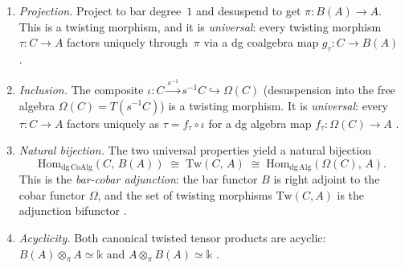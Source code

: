\begin{proposition}\label{prop:universal-twisting-adjunction}
\begin{enumerate}[label=\textup{(\roman*)}]
\item \emph{Projection.}
  Project to bar degree~$1$ and desuspend to get
  $\pi\colon B(A) \to A$.
  This is a twisting morphism, and it is \emph{universal}:
  every twisting morphism $\tau\colon C \to A$ factors
  uniquely through~$\pi$ via a dg coalgebra map
  $g_\tau\colon C \to B(A)$
  \cite[Theorem~2.2.4]{LV12}.

\item \emph{Inclusion.}
  The composite
  $\iota\colon C \xrightarrow{s^{-1}} s^{-1}C
  \hookrightarrow \Omega(C)$
  (desuspension into the free algebra $\Omega(C) = T(s^{-1}C)$)
  is a twisting morphism.  It is \emph{universal}:
  every $\tau\colon C \to A$ factors uniquely as
  $\tau = f_\tau \circ \iota$ for a dg algebra map
  $f_\tau\colon \Omega(C) \to A$
  \cite[Theorem~2.2.7]{LV12}.

\item \emph{Natural bijection.}
  The two universal properties yield a natural bijection
  \begin{equation}\label{eq:tw-adjunction}
  \mathrm{Hom}_{\mathrm{dg\,CoAlg}}(C,\, B(A))
  \;\cong\;
  \mathrm{Tw}(C,\, A)
  \;\cong\;
  \mathrm{Hom}_{\mathrm{dg\,Alg}}(\Omega(C),\, A).
  \end{equation}
  This is the \emph{bar-cobar adjunction}: the bar functor $B$ is
  right adjoint to the cobar functor $\Omega$, and the set of
  twisting morphisms $\mathrm{Tw}(C, A)$ is the adjunction
  bifunctor \cite[Theorem~2.2.9]{LV12}.

\item \emph{Acyclicity.}
  Both canonical twisted tensor products are acyclic:
  $B(A) \otimes_\pi A \simeq \mathbb{k}$
  and $A \otimes_\pi B(A) \simeq \mathbb{k}$
  \cite[Corollary~2.2.5]{LV12}.
\end{enumerate}
\end{proposition}

